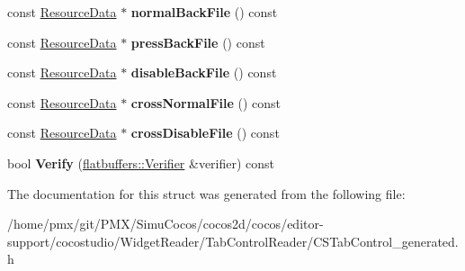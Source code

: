 \begin{DoxyCompactItemize}
\item 
\mbox{\label{structflatbuffers_1_1TabHeaderOption_ac57dc10b5fa481b4905ab5d7bfc6d6a3}} 
const \hyperlink{structflatbuffers_1_1ResourceData}{Resource\+Data} $\ast$ {\bfseries normal\+Back\+File} () const
\item 
\mbox{\label{structflatbuffers_1_1TabHeaderOption_a754306a041bc39f8ae1aab2c1cc067ce}} 
const \hyperlink{structflatbuffers_1_1ResourceData}{Resource\+Data} $\ast$ {\bfseries press\+Back\+File} () const
\item 
\mbox{\label{structflatbuffers_1_1TabHeaderOption_a58de8973e824ecb9a8dd28b6f28f0d33}} 
const \hyperlink{structflatbuffers_1_1ResourceData}{Resource\+Data} $\ast$ {\bfseries disable\+Back\+File} () const
\item 
\mbox{\label{structflatbuffers_1_1TabHeaderOption_ab6984b511f3d64fdb5ffd8a1369962d0}} 
const \hyperlink{structflatbuffers_1_1ResourceData}{Resource\+Data} $\ast$ {\bfseries cross\+Normal\+File} () const
\item 
\mbox{\label{structflatbuffers_1_1TabHeaderOption_afb53b09600419c4e16059a8fb32d08df}} 
const \hyperlink{structflatbuffers_1_1ResourceData}{Resource\+Data} $\ast$ {\bfseries cross\+Disable\+File} () const
\item 
\mbox{\label{structflatbuffers_1_1TabHeaderOption_a594982cdc2b5ca59f9c33e5d9aa3674d}} 
bool {\bfseries Verify} (\hyperlink{classflatbuffers_1_1Verifier}{flatbuffers\+::\+Verifier} \&verifier) const
\end{DoxyCompactItemize}


The documentation for this struct was generated from the following file\+:\begin{DoxyCompactItemize}
\item 
/home/pmx/git/\+P\+M\+X/\+Simu\+Cocos/cocos2d/cocos/editor-\/support/cocostudio/\+Widget\+Reader/\+Tab\+Control\+Reader/C\+S\+Tab\+Control\+\_\+generated.\+h\end{DoxyCompactItemize}
